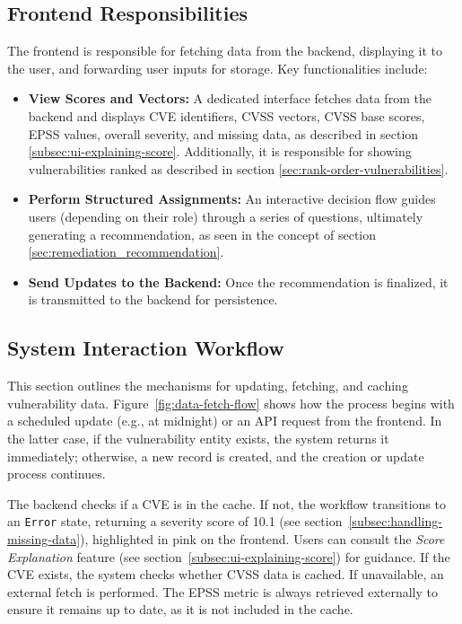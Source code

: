 \subsection{Frontend Responsibilities}
\label{subsec:frontend-responsibilities}

The frontend is responsible for fetching data from the backend, displaying it to the user, and forwarding user inputs for storage. Key functionalities include:

\begin{itemize}
  \item \textbf{View Scores and Vectors:} A dedicated interface fetches data from the backend and displays \ac{CVE} identifiers, \ac{CVSS} vectors, \ac{CVSS} base scores, \ac{EPSS} values, overall severity, and missing data, as described in section \ref{subsec:ui-explaining-score}. Additionally, it is responsible for showing vulnerabilities ranked as described in section \ref{sec:rank-order-vulnerabilities}.
  \item \textbf{Perform Structured Assignments:} An interactive decision flow guides users (depending on their role) through a series of questions, ultimately generating a recommendation, as seen in the concept of section \ref{sec:remediation_recommendation}. 
  \item \textbf{Send Updates to the Backend:} Once the recommendation is finalized, it is transmitted to the backend for persistence.
\end{itemize}


\subsection{System Interaction Workflow}
\label{subsec:system-interaction}

This section outlines the mechanisms for updating, fetching, and caching vulnerability data. Figure~\ref{fig:data-fetch-flow} shows how the process begins with a scheduled update (e.g., at midnight) or an \ac{API} request from the frontend. In the latter case, if the vulnerability entity exists, the system returns it immediately; otherwise, a new record is created, and the creation or update process continues.

The backend checks if a \ac{CVE} is in the cache. If not, the workflow transitions to an \texttt{Error} state, returning a severity score of 10.1 (see section~\ref{subsec:handling-missing-data}), highlighted in pink on the frontend. Users can consult the \emph{Score Explanation} feature (see section~\ref{subsec:ui-explaining-score}) for guidance. If the \ac{CVE} exists, the system checks whether \ac{CVSS} data is cached. If unavailable, an external fetch is performed. The \ac{EPSS} metric is always retrieved externally to ensure it remains up to date, as it is not included in the cache.

